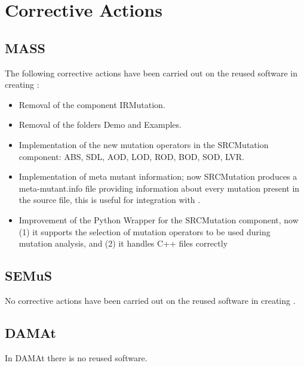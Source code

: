 
\chapter{Corrective Actions}

\section{MASS}

The following corrective actions have been carried out on the reused software in creating \MASS:

\begin{itemize}
	\item Removal of the component IRMutation.
	\item Removal of the folders Demo and Examples.
	\item Implementation of the new mutation operators in the SRCMutation component: ABS, SDL, AOD, LOD, ROD, BOD, SOD, LVR.
	\item Implementation of meta mutant information; now SRCMutation produces a meta-mutant.info file providing information about every mutation present in the source file, this is useful for integration with \SEMUS.
	\item Improvement of the Python Wrapper for the SRCMutation component, now (1) it supports the selection of mutation operators to be used during mutation analysis, and (2) it handles C++ files correctly
\end{itemize}


\section{SEMuS}

No corrective actions have been carried out on the reused software in creating \SEMUS.

\section{DAMAt}

In DAMAt there is no reused software.